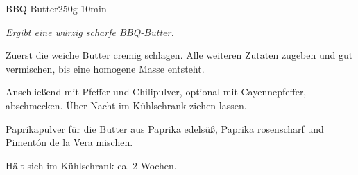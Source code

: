 \documentclass[../recipe-collections/cooking.tex]{subfiles}
\begin{document}
\begin{recipe}{BBQ-Butter}{250g }{10min }

  \freeform{}\textit{Ergibt eine würzig scharfe BBQ-Butter.}


  Zuerst die weiche Butter cremig schlagen.
  Alle weiteren Zutaten zugeben und gut vermischen, bis eine homogene Masse entsteht.


  Anschließend mit Pfeffer und Chilipulver, optional mit Cayennepfeffer, abschmecken.
  Über Nacht im Kühlschrank ziehen lassen.

  \freeform{}\hrulefill{}

  \freeform{}
  Paprikapulver für die Butter aus Paprika edelsüß, Paprika rosenscharf und Pimentón de la Vera mischen.

  \freeform{}
  Hält sich im Kühlschrank ca. 2 Wochen.

\end{recipe}
\end{document}
